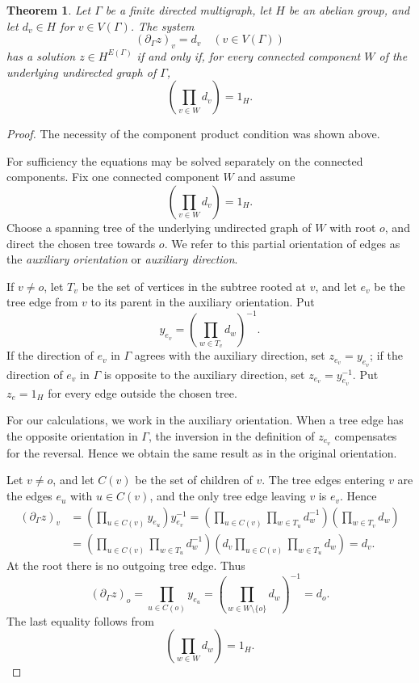 \documentclass[11pt]{article}
\theoremstyle{plain}
\newtheorem{theorem}{Theorem}[section]
\theoremstyle{remark}
\theoremstyle{definition}
\theoremstyle{plain}
\begin{document}
\begin{theorem}\label{t:incidence-criterion}
Let $\Gamma$ be a finite directed multigraph, let $H$ be an abelian group, and
let $d_v\in H$ for $v\in V(\Gamma)$. The system
\begin{equation}\label{eq:incidence-equation}
        (\partial_\Gamma z)_v=d_v
        \quad (v\in V(\Gamma))
\end{equation}
has a solution $z\in H^{E(\Gamma)}$ if and only if, for every connected
component $W$ of the underlying undirected graph of $\Gamma$,
\[
        \left(
        \prod_{v\in W}d_v
        \right)=1_H.
\]
\end{theorem}

\begin{proof}
	The necessity of the component product condition was shown above.

For sufficiency the equations may be solved separately on the connected
components. Fix one connected component $W$ and assume
\[
        \left(
        \prod_{v\in W}d_v
        \right)=1_H.
\]
Choose a spanning tree of the underlying undirected graph of $W$ with
root $o$, and direct the chosen tree towards $o$. We refer to this partial orientation of edges as the \emph{auxiliary orientation} or \emph{auxiliary direction}.

  If $v\ne o$, let $T_v$ be the
set of vertices in the subtree rooted at $v$, and let $e_v$ be the tree edge
from $v$ to its parent in the auxiliary orientation. Put
\[
        y_{e_v}
        =
        \left(
        \prod_{w\in T_v}d_w
        \right)^{-1}.
\]
If the direction of $e_v$ in $\Gamma$ agrees with the auxiliary direction, set
$z_{e_v}=y_{e_v}$; if the direction of $e_v$ in $\Gamma$ is opposite to the
auxiliary direction, set $z_{e_v}=y_{e_v}^{-1}$. Put $z_e=1_H$ for every edge
outside the chosen tree.

{
For our calculations, we work in the auxiliary orientation. When a tree edge has the opposite orientation in $\Gamma$, the inversion in the definition of $z_{e_v}$ compensates for the reversal. Hence we obtain the same result as in the original orientation.}

\begingroup
Let $v\ne o$, and let $C(v)$ be the set of children of $v$. The tree edges
entering $v$ are the edges $e_u$ with $u\in C(v)$, and the only tree edge
leaving $v$ is $e_v$. Hence
\[
\begin{aligned}
(\partial_\Gamma z)_v
&=\left(\prod_{u\in C(v)}y_{e_u}\right)y_{e_v}^{-1}
 =\left(\prod_{u\in C(v)}\prod_{w\in T_u}d_w^{-1}\right)
  \left(\prod_{w\in T_v}d_w\right)\\
&=\left(\prod_{u\in C(v)}\prod_{w\in T_u}d_w^{-1}\right)
  \left(d_v\prod_{u\in C(v)}\prod_{w\in T_u}d_w\right)
 =d_v.
\end{aligned}
\]
\endgroup
At the root there is no outgoing tree edge. Thus
\[
(\partial_\Gamma z)_o
=\prod_{u\in C(o)}y_{e_u}
=\left(\prod_{w\in W\setminus\{o\}}d_w\right)^{-1}
=d_o.
\]
The last equality follows from
\[
        \left(
        \prod_{w\in W}d_w
        \right)=1_H.
\]


\end{proof}
\end{document}
